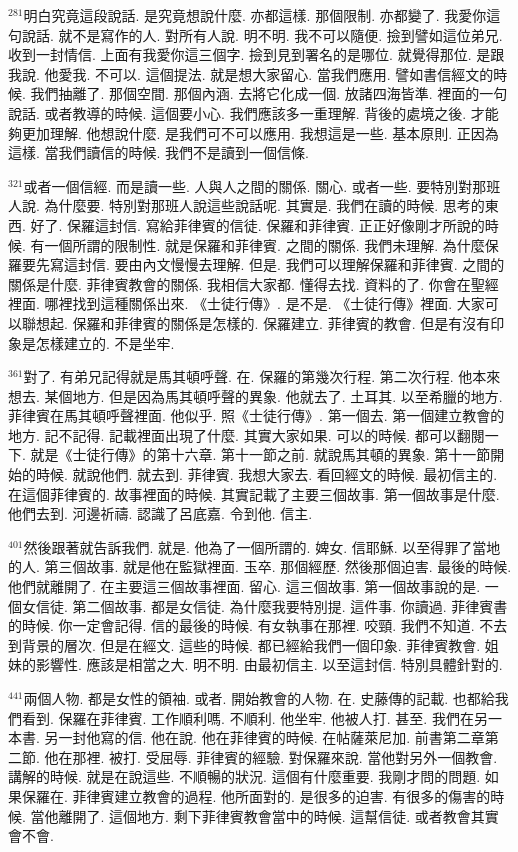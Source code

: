\documentclass{book}
\begin{document}
$^{281}$明白究竟這段說話.
是究竟想說什麼.
亦都這樣.
那個限制.
亦都變了.
我愛你這句說話.
就不是寫作的人.
對所有人說.
明不明.
我不可以隨便.
撿到譬如這位弟兄.
收到一封情信.
上面有我愛你這三個字.
撿到見到署名的是哪位.
就覺得那位.
是跟我說.
他愛我.
不可以.
這個提法.
就是想大家留心.
當我們應用.
譬如書信經文的時候.
我們抽離了.
那個空間.
那個內涵.
去將它化成一個.
放諸四海皆準.
裡面的一句說話.
或者教導的時候.
這個要小心.
我們應該多一重理解.
背後的處境之後.
才能夠更加理解.
他想說什麼.
是我們可不可以應用.
我想這是一些.
基本原則.
正因為這樣.
當我們讀信的時候.
我們不是讀到一個信條.

$^{321}$或者一個信經.
而是讀一些.
人與人之間的關係.
關心.
或者一些.
要特別對那班人說.
為什麼要.
特別對那班人說這些說話呢.
其實是.
我們在讀的時候.
思考的東西.
好了.
保羅這封信.
寫給菲律賓的信徒.
保羅和菲律賓.
正正好像剛才所說的時候.
有一個所謂的限制性.
就是保羅和菲律賓.
之間的關係.
我們未理解.
為什麼保羅要先寫這封信.
要由內文慢慢去理解.
但是.
我們可以理解保羅和菲律賓.
之間的關係是什麼.
菲律賓教會的關係.
我相信大家都.
懂得去找.
資料的了.
你會在聖經裡面.
哪裡找到這種關係出來.
《士徒行傳》.
是不是.
《士徒行傳》裡面.
大家可以聯想起.
保羅和菲律賓的關係是怎樣的.
保羅建立.
菲律賓的教會.
但是有沒有印象是怎樣建立的.
不是坐牢.

$^{361}$對了.
有弟兄記得就是馬其頓呼聲.
在.
保羅的第幾次行程.
第二次行程.
他本來想去.
某個地方.
但是因為馬其頓呼聲的異象.
他就去了.
土耳其.
以至希臘的地方.
菲律賓在馬其頓呼聲裡面.
他似乎.
照《士徒行傳》.
第一個去.
第一個建立教會的地方.
記不記得.
記載裡面出現了什麼.
其實大家如果.
可以的時候.
都可以翻閱一下.
就是《士徒行傳》的第十六章.
第十一節之前.
就說馬其頓的異象.
第十一節開始的時候.
就說他們.
就去到.
菲律賓.
我想大家去.
看回經文的時候.
最初信主的.
在這個菲律賓的.
故事裡面的時候.
其實記載了主要三個故事.
第一個故事是什麼.
他們去到.
河邊祈禱.
認識了呂底嘉.
令到他.
信主.

$^{401}$然後跟著就告訴我們.
就是.
他為了一個所謂的.
婢女.
信耶穌.
以至得罪了當地的人.
第三個故事.
就是他在監獄裡面.
玉卒.
那個經歷.
然後那個迫害.
最後的時候.
他們就離開了.
在主要這三個故事裡面.
留心.
這三個故事.
第一個故事說的是.
一個女信徒.
第二個故事.
都是女信徒.
為什麼我要特別提.
這件事.
你讀過.
菲律賓書的時候.
你一定會記得.
信的最後的時候.
有女執事在那裡.
咬頸.
我們不知道.
不去到背景的層次.
但是在經文.
這些的時候.
都已經給我們一個印象.
菲律賓教會.
姐妹的影響性.
應該是相當之大.
明不明.
由最初信主.
以至這封信.
特別具體針對的.

$^{441}$兩個人物.
都是女性的領袖.
或者.
開始教會的人物.
在.
史藤傳的記載.
也都給我們看到.
保羅在菲律賓.
工作順利嗎.
不順利.
他坐牢.
他被人打.
甚至.
我們在另一本書.
另一封他寫的信.
他在說.
他在菲律賓的時候.
在帖薩萊尼加.
前書第二章第二節.
他在那裡.
被打.
受屈辱.
菲律賓的經驗.
對保羅來說.
當他對另外一個教會.
講解的時候.
就是在說這些.
不順暢的狀況.
這個有什麼重要.
我剛才問的問題.
如果保羅在.
菲律賓建立教會的過程.
他所面對的.
是很多的迫害.
有很多的傷害的時候.
當他離開了.
這個地方.
剩下菲律賓教會當中的時候.
這幫信徒.
或者教會其實會不會.
\end{document}
